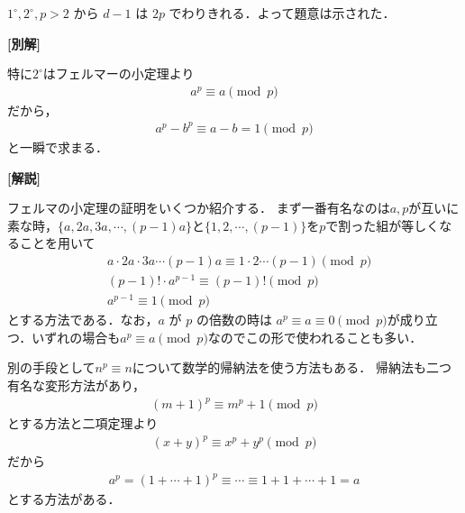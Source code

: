 \documentclass[../../main.tex]{subfiles}
\begin{document}
$1^\circ, 2^\circ, p>2$ から $d-1$ は $2p$ でわりきれる．よって題意は示された．

{\bf [別解]}

特に$2^\circ$はフェルマーの小定理より
\begin{align}
  a^p \equiv a \pmod{p}
\end{align}
だから，
\begin{align}
  a^p - b^p \equiv a - b = 1 \pmod{p}
\end{align}
と一瞬で求まる．

{\bf [解説]}

フェルマの小定理の証明をいくつか紹介する．
まず一番有名なのは$a,p$が互いに素な時，$\{a,2a,3a,\cdots,(p-1)a\}$と$\{1,2,\cdots,(p-1)\}$を$p$で割った組が等しくなることを用いて
\begin{align}
  & a \cdot 2a \cdot 3a \cdots (p-1)a \equiv 1 \cdot 2 \cdots (p-1) \pmod p \\
  & (p-1)! \cdot a^{p-1} \equiv (p-1)! \pmod p \\
  & a^{p-1} \equiv 1 \pmod p
\end{align}
とする方法である．なお，$a$ が $p$ の倍数の時は $a^p \equiv a \equiv 0 \pmod{p}$が成り立つ．いずれの場合も$a^{p}\equiv a \pmod{p}$なのでこの形で使われることも多い．

別の手段として$n^p\equiv n$について数学的帰納法を使う方法もある．
帰納法も二つ有名な変形方法があり，
\begin{align}
  (m+1)^p \equiv m^p + 1 \pmod p
\end{align}
とする方法と二項定理より
\begin{align}
  (x+y)^p \equiv x^p + y^p \pmod p
\end{align}
だから
\begin{align}
  a^p = (1 + \cdots + 1)^p \equiv \cdots \equiv 1 + 1 + \cdots + 1 = a
\end{align}
とする方法がある．
\end{document}
